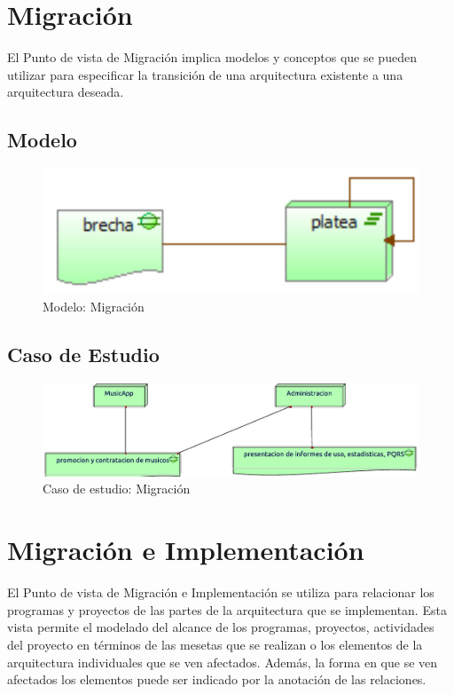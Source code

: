 \newpage

\section{Migración}
El Punto de vista de Migración implica modelos y conceptos que se pueden utilizar para especificar la transición de una arquitectura existente a una arquitectura deseada. \cite{ArchiMat55:online} \vspace{\baselineskip}


\subsection{Modelo}
\begin{figure}[h!]
	\centering
	\includegraphics[width=0.8\linewidth]{Arquitectura/Migracion/imgs/MigracionMetamodelo.PNG}
	\caption{Modelo:  Migración}
\end{figure}
\newpage
\subsection{Caso de Estudio}
\begin{figure}[h!]
	\centering
	\includegraphics[width=\linewidth]{Arquitectura/Migracion/imgs/Migracion.pdf}
	\caption{Caso de estudio: Migración}
	\label{fig:comportamiento}
\end{figure}

\newpage

\section{Migración e Implementación}
El Punto de vista de Migración e Implementación se utiliza para relacionar los programas y proyectos de las partes de la arquitectura que se implementan. Esta vista permite el modelado del alcance de los programas, proyectos, actividades del proyecto en términos de las mesetas que se realizan o los elementos de la arquitectura individuales que se ven afectados. Además, la forma en que se ven afectados los elementos puede ser indicado por la anotación de las relaciones. \cite{ArchiMat55:online} \vspace{\baselineskip}

